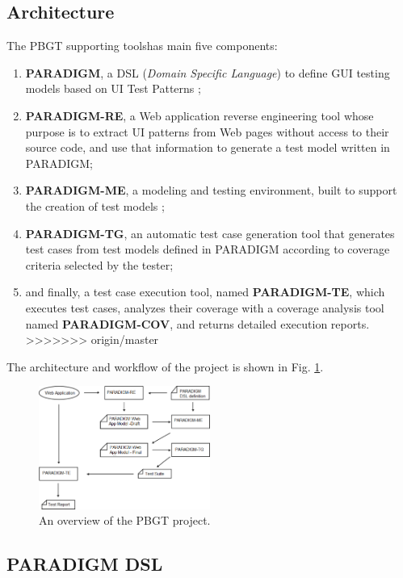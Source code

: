 \documentclass[conference]{IEEEtran}
\begin{document}
\begin{enumerate}
\subsection{Architecture}
The PBGT supporting toolshas main five components: 
\begin{enumerate}
\item \textbf{PARADIGM}, a DSL (\textit{Domain Specific Language}) to define GUI testing models based on UI Test Patterns \cite{enase14}; 
\item \textbf{PARADIGM-RE}, a Web application reverse engineering tool whose purpose is to extract UI patterns from Web pages without access to their source code, and use that information to generate a test model written in PARADIGM; 
\item \textbf{PARADIGM-ME}, a modeling and testing environment, built to support the creation of test models \cite{conf_icst_MonteiroP13}; 
\item  \textbf{PARADIGM-TG}, an automatic test case generation tool that generates test cases from test models defined in PARADIGM according to coverage criteria selected by the tester; 
\item and finally, a test case execution tool, named \textbf{PARADIGM-TE}, which executes test cases, analyzes their coverage with a coverage analysis tool named \textbf{PARADIGM-COV}\cite{vilela2014cov}, and returns detailed execution reports. 
>>>>>>> origin/master
\end{enumerate}

The architecture and workflow of the project is shown in Fig. \ref{fig:pbgt}.
\begin{figure}[!htb]
\centering
\includegraphics[width=0.5\textwidth]{pbgt}
\caption{An overview of the PBGT project.}
\label{fig:pbgt}
\end{figure}

\subsection{PARADIGM DSL}\label{sec:dsl}


\end{enumerate}
\end{document}

